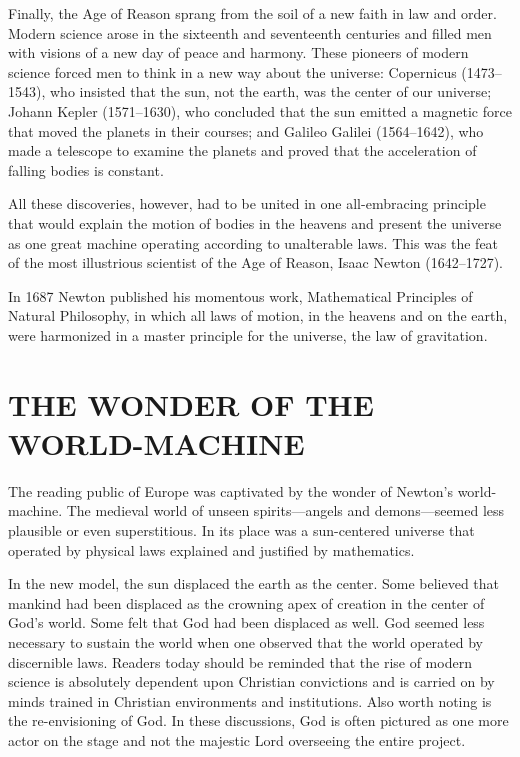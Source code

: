 Finally, the Age of Reason sprang from the soil of a new faith in law and order. Modern science
arose in the sixteenth and seventeenth centuries and filled men with visions of a new day of peace
and harmony. These pioneers of modern science forced men to think in a new way about the universe:
Copernicus (1473–1543), who insisted that the sun, not the earth, was the center of our universe;
Johann Kepler (1571–1630), who concluded that the sun emitted a magnetic force that moved the
planets in their courses; and Galileo Galilei (1564–1642), who made a telescope to examine the
planets and proved that the acceleration of falling bodies is constant.

All these discoveries, however, had to be united in one all-embracing principle that would explain
the motion of bodies in the heavens and present the universe as one great machine operating
according to unalterable laws. This was the feat of the most illustrious scientist of the Age of
Reason, Isaac Newton (1642–1727).

In 1687 Newton published his momentous work, Mathematical Principles of Natural Philosophy, in which
all laws of motion, in the heavens and on the earth, were harmonized in a master principle for the
universe, the law of gravitation.

\section{THE WONDER OF THE WORLD-MACHINE}

The reading public of Europe was captivated by the wonder of Newton’s world-machine. The medieval
world of unseen spirits—angels and demons—seemed less plausible or even superstitious. In its place
was a sun-centered universe that operated by physical laws explained and justified by mathematics.

In the new model, the sun displaced the earth as the center. Some believed that mankind had been
displaced as the crowning apex of creation in the center of God’s world. Some felt that God had been
displaced as well. God seemed less necessary to sustain the world when one observed that the world
operated by discernible laws. Readers today should be reminded that the rise of modern science is
absolutely dependent upon Christian convictions and is carried on by minds trained in Christian
environments and institutions. Also worth noting is the re-envisioning of God. In these discussions,
God is often pictured as one more actor on the stage and not the majestic Lord overseeing the entire
project.

